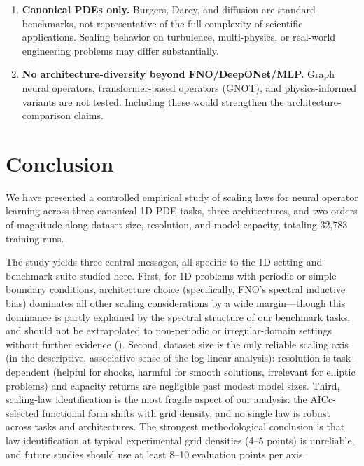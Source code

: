 \documentclass[11pt]{article}
\newcommand{\totalRuns}{32{,}783}
\begin{document}
\begin{enumerate}[leftmargin=*,itemsep=2pt]
  \item \textbf{Canonical PDEs only.}
    Burgers, Darcy, and diffusion are standard benchmarks, not
    representative of the full complexity of scientific applications.
    Scaling behavior on turbulence, multi-physics, or real-world
    engineering problems may differ substantially.

  \item \textbf{No architecture-diversity beyond FNO/DeepONet/MLP.}
    Graph neural operators, transformer-based operators (GNOT),
    and physics-informed variants are not tested. Including these
    would strengthen the architecture-comparison claims.
\end{enumerate}


\section{Conclusion}
\label{sec:conclusion}

We have presented a controlled empirical study of scaling laws for
neural operator learning across three canonical 1D PDE tasks,
three architectures, and two orders of magnitude along dataset size,
resolution, and model capacity, totaling \totalRuns{} training runs.

The study yields three central messages, all specific to the 1D
setting and benchmark suite studied here.
First, for 1D problems with periodic or simple boundary conditions,
architecture choice (specifically, FNO's spectral inductive bias)
dominates all other scaling considerations by a wide margin---though
this dominance is partly explained by the spectral structure of our
benchmark tasks, and should not be extrapolated to non-periodic or
irregular-domain settings without further evidence
().
Second, dataset size is the only reliable scaling axis
(in the descriptive, associative sense of the log-linear analysis):
resolution is task-dependent (helpful for shocks, harmful for smooth
solutions, irrelevant for elliptic problems) and capacity returns
are negligible past modest model sizes.
Third, scaling-law identification is the most fragile aspect of our
analysis: the AICc-selected functional form shifts with grid density,
and no single law is robust across tasks and architectures.
The strongest methodological conclusion is that law identification
at typical experimental grid densities (4--5 points) is unreliable,
and future studies should use at least 8--10 evaluation points per
axis.
\end{document}
